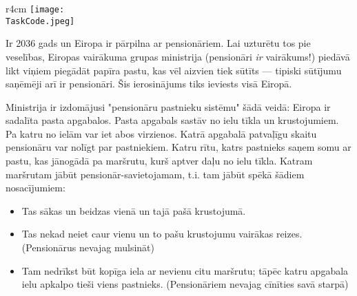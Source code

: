 \documentclass{boi2014-lv}
\renewcommand{\TaskCode}{postmen}
\begin{document}
    \begin{wrapfigure}[8]{r}{4cm}
        \vspace{-18pt}
		\texttt{[image: \\TaskCode.jpeg]}
	\end{wrapfigure}
    Ir 2036 gads un Eiropa ir pārpilna ar pensionāriem. Lai uzturētu tos pie veselības, Eiropas vairākuma grupas ministrija (pensionāri \emph{ir} vairākums!) piedāvā likt viņiem piegādāt papīra pastu, kas vēl aizvien tiek sūtīts --- tipiski sūtījumu saņēmēji arī ir pensionāri. Šis ierosinājums tiks ieviests visā Eiropā.

		Ministrija ir izdomājusi "pensionāru pastnieku sistēmu" šādā veidā: Eiropa ir sadalīta pasta apgabalos. Pasta apgabals sastāv no ielu tīkla un krustojumiem. Pa katru no ielām var iet abos virzienos. Katrā apgabalā patvaļīgu skaitu pensionāru var nolīgt par pastniekiem. Katru rītu, katrs pastnieks saņem somu ar pastu, kas jānogādā pa maršrutu, kurš aptver daļu no ielu tīkla. Katram maršrutam jābūt pensionār-savietojamam, t.i. tam jābūt spēkā šādiem nosacījumiem:

    \begin{itemize}
        \item Tas sākas un beidzas vienā un tajā pašā krustojumā. %
        \item Tas nekad neiet caur vienu un to pašu krustojumu vairākas reizes. (Pensionārus nevajag mulsināt)%
        \item Tam nedrīkst būt kopīga iela ar nevienu citu maršrutu; tāpēc katru apgabala ielu apkalpo tieši viens pastnieks. (Pensionāriem nevajag cīnīties savā starpā) %
    \end{itemize}
\end{document}

